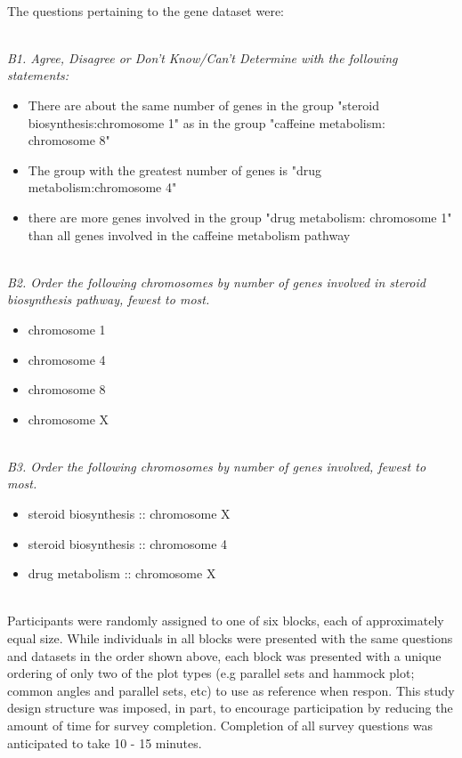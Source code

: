 \noindent \\  The questions pertaining to the gene dataset were: 

\noindent \\ \emph{B1. Agree, Disagree or Don't Know/Can't Determine with the following statements:}
\begin{itemize}
\item There are about the same number of genes in the group "steroid biosynthesis:chromosome 1" as in the group "caffeine metabolism: chromosome 8"
\item The group with the greatest number of genes is "drug metabolism:chromosome 4"
\item there are more genes involved in the group "drug metabolism: chromosome 1" than all genes involved in the caffeine metabolism pathway
\end{itemize}

\noindent \\ \emph{B2. Order the following chromosomes by number of genes involved in steroid biosynthesis pathway, fewest to most.}
\begin{itemize}
\item chromosome 1
\item chromosome 4
\item chromosome 8 
\item chromosome X
\end{itemize}

\noindent \\ \emph{B3. Order the following chromosomes by number of genes involved, fewest to most.}
\begin{itemize}
\item steroid biosynthesis :: chromosome X
\item steroid biosynthesis :: chromosome 4
\item drug metabolism :: chromosome X
\end{itemize} 

\noindent \\Participants were randomly assigned to one of six blocks, each of approximately equal size. While individuals in all blocks were presented with the same questions and datasets in the order shown above, each block was presented with a unique ordering of only two of the plot types (e.g parallel sets and hammock plot; common angles and parallel sets, etc) to use as reference when respon. This study design structure was imposed, in part,  to encourage participation by reducing the amount of time for survey completion. Completion of all survey questions was anticipated to take 10 - 15 minutes.

